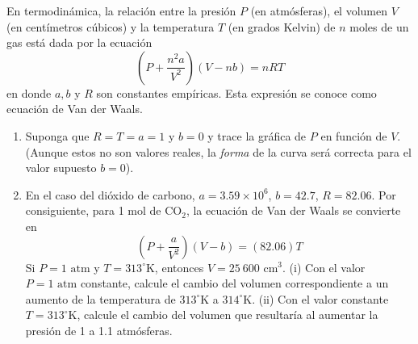 \item En termodinámica, la relación entre la presión $P$ (en atmósferas), el volumen $V$ (en centímetros cúbicos) y la temperatura $T$ (en grados Kelvin) de $n$ moles de un gas está dada por la ecuación
$$\left(P + \frac{n^2a}{V^2}\right)(V - nb) = nRT$$
en donde $a, b$ y $R$ son constantes empíricas. Esta expresión se conoce como ecuación de Van der Waals.
\begin{enumerate}
    \item[(a)] Suponga que $R = T = a = 1$ y $b = 0$ y trace la gráfica de $P$ en función de $V$. (Aunque estos no son valores reales, la \textit{forma} de la curva será correcta para el valor supuesto $b=0$).
    \item[(b)] En el caso del dióxido de carbono, $a = 3.59 \times 10^6$, $b = 42.7$, $R = 82.06$. Por consiguiente, para 1 mol de $\text{CO}_2$, la ecuación de Van der Waals se convierte en
    $$\left(P + \frac{a}{V^2}\right)(V - b) = (82.06)T$$
    Si $P = 1 \text{ atm}$ y $T = 313^\circ\text{K}$, entonces $V = 25\ 600 \text{ cm}^3$.
    (i) Con el valor $P = 1 \text{ atm}$ constante, calcule el cambio del volumen correspondiente a un aumento de la temperatura de $313^\circ\text{K}$ a $314^\circ\text{K}$.
    (ii) Con el valor constante $T = 313^\circ\text{K}$, calcule el cambio del volumen que resultaría al aumentar la presión de 1 a 1.1 atmósferas.
\end{enumerate}

